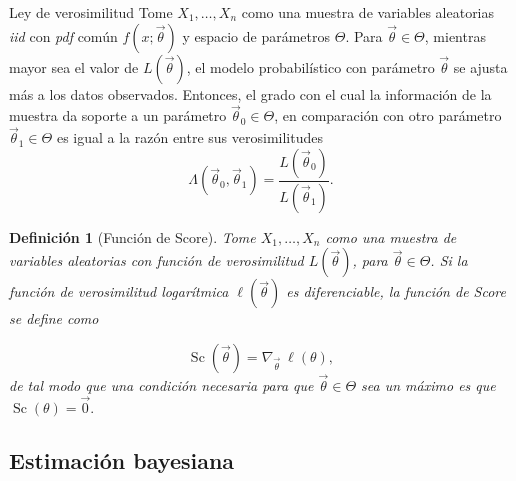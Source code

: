 \documentclass{beamer}
\newtheorem{defi}{Definición}[section]
\begin{document}
		\begin{frame}[allowframebreaks]
		
		\begin{block}{Ley de verosimilitud}
		Tome $X_1,\dots,X_n$ como una muestra de variables aleatorias \textit{iid} con \textit{pdf} común $f(x;\vec{\theta})$ y espacio de parámetros $\Theta$. Para $\vec{\theta}\in\Theta$, mientras mayor sea el valor de $L(\vec{\theta})$, el modelo probabilístico con parámetro $\vec{\theta}$ se ajusta más a los datos observados. Entonces, el grado con el cual la información de la muestra da soporte a un parámetro $\vec{\theta}_0\in\Theta$, en comparación con otro parámetro $\vec{\theta}_1\in\Theta$ es igual a la razón entre sus verosimilitudes
		$$\Lambda(\vec{\theta}_0,\vec{\theta}_1)=\frac{L(\vec{\theta}_0)}{L(\vec{\theta}_1)}.$$
		\end{block}
		
		\begin{defi}[Función de Score]
			Tome $X_1,\dots,X_n$ como una muestra de variables aleatorias con función de verosimilitud $L(\vec{\theta})$, para $\vec{\theta}\in\Theta$. Si la función de verosimilitud logarítmica $\ell(\vec{\theta})$ es diferenciable, la función de Score se define como
			
			$$\mathop{Sc}(\vec{\theta})=\nabla_{\vec{\theta}}\ \ell(\theta),$$
			de tal modo que una condición necesaria para que $\vec{\theta}\in\Theta$ sea un máximo es que $\mathop{Sc}(\theta)=\vec{0}.$
		\end{defi}
	\end{frame}
	
	\subsection{Estimación bayesiana}
	
\end{document}
